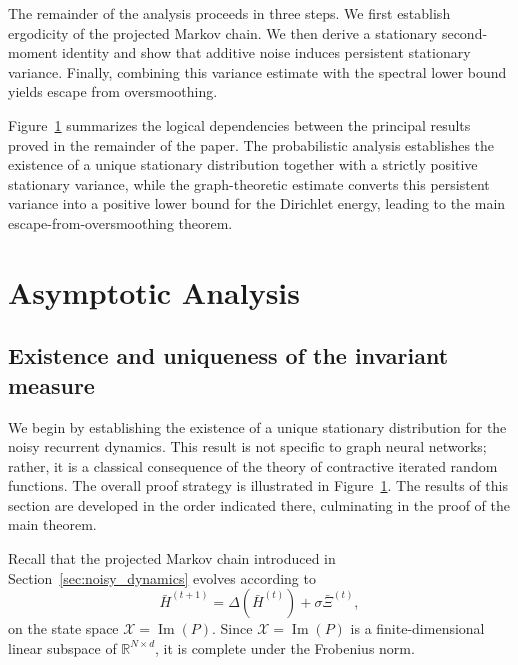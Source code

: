 \documentclass{article}
\begin{document}
The remainder of the analysis proceeds in three steps. We first establish ergodicity of the projected Markov chain. We then derive a stationary second-moment identity and show that additive noise induces persistent stationary variance. Finally, combining this variance estimate with the spectral lower bound yields escape from oversmoothing.

\begin{figure}[omitted: a diagram of this paper's results, not reproduced here]\label{fig:proof_structure}\end{figure}

Figure~\ref{fig:proof_structure} summarizes the logical dependencies
between the principal results proved in the remainder of the paper.
The probabilistic analysis establishes the existence of a unique
stationary distribution together with a strictly positive stationary
variance, while the graph-theoretic estimate converts this persistent
variance into a positive lower bound for the Dirichlet energy, leading
to the main escape-from-oversmoothing theorem.

\section{Asymptotic Analysis}
\label{sec:Asymptotic_Analysis}

\subsection{Existence and uniqueness of the invariant measure}

We begin by establishing the existence of a unique stationary
distribution for the noisy recurrent dynamics.
This result is not specific to graph neural networks; rather, it is a
classical consequence of the theory of contractive iterated random
functions.
The overall proof strategy is illustrated in
Figure~\ref{fig:proof_structure}.
The results of this section are developed in the order indicated there,
culminating in the proof of the main theorem.

Recall that the projected Markov chain introduced in
Section~\ref{sec:noisy_dynamics}
evolves according to
\[
\bar H^{(t+1)}
=
\Delta(\bar H^{(t)})
+
\sigma\bar\Xi^{(t)},
\]
on the state space
$\mathcal X=\operatorname{Im}(P)$.
Since $\mathcal X=\operatorname{Im}(P)$ is a finite-dimensional linear subspace of $\mathbb R^{N\times d}$, it is complete under the Frobenius norm.
\end{document}
